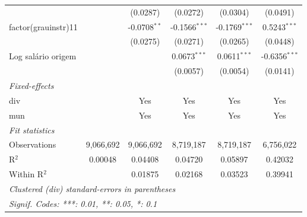 \begin{tabular}{lccccc}
                            &                & (0.0287)                & (0.0272)                & (0.0304)                & (0.0491)\\   
   factor(grauinstr)11      &                & -0.0708$^{**}$          & -0.1566$^{***}$         & -0.1769$^{***}$         & 0.5243$^{***}$\\   
                            &                & (0.0275)                & (0.0271)                & (0.0265)                & (0.0448)\\   
   Log salário origem       &                &                         & 0.0673$^{***}$          & 0.0611$^{***}$          & -0.6356$^{***}$\\   
                            &                &                         & (0.0057)                & (0.0054)                & (0.0141)\\   
   \midrule
   \emph{Fixed-effects}\\
   div                      &                & Yes                     & Yes                     & Yes                     & Yes\\  
   mun                      &                & Yes                     & Yes                     & Yes                     & Yes\\  
   \midrule
   \emph{Fit statistics}\\
   Observations             & 9,066,692      & 9,066,692               & 8,719,187               & 8,719,187               & 6,756,022\\  
   R$^2$                    & 0.00048        & 0.04408                 & 0.04720                 & 0.05897                 & 0.42032\\  
   Within R$^2$             &                & 0.01875                 & 0.02168                 & 0.03523                 & 0.39941\\  
   \midrule \midrule
   \multicolumn{6}{l}{\emph{Clustered (div) standard-errors in parentheses}}\\
   \multicolumn{6}{l}{\emph{Signif. Codes: ***: 0.01, **: 0.05, *: 0.1}}\\
\end{tabular}
\par\endgroup


